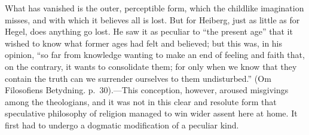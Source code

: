 \documentclass[12pt,a4paper]{book}
\begin{document}
What has vanished is the outer, perceptible form, which the
childlike imagination misses, and with which it believes all is lost. But
for Heiberg, just as little as for Hegel, does anything go lost. He saw it
as peculiar to ``the present age'' that it wished to know what former
ages had felt and believed; but this was, in his opinion, ``so far from
knowledge wanting to make an end of feeling and faith that, on the
contrary, it wants to consolidate them; for only when we know that they
contain the truth can we surrender ourselves to them undisturbed.''
(Om Filosofiens Betydning. p.~30).---This conception, however,
aroused misgivings among the theologians, and it was not in this clear
and resolute form that speculative philosophy of religion managed to win
wider assent here at home. It first had to undergo a dogmatic
modification of a peculiar kind.
\end{document}
